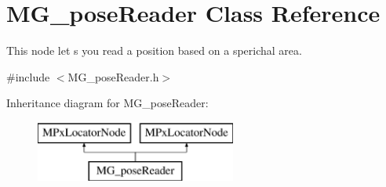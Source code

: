 \hypertarget{class_m_g__pose_reader}{\section{M\-G\-\_\-pose\-Reader Class Reference}
\label{class_m_g__pose_reader}
}


This node let s you read a position based on a sperichal area.  




{\ttfamily \#include $<$M\-G\-\_\-pose\-Reader.\-h$>$}

Inheritance diagram for M\-G\-\_\-pose\-Reader\-:\begin{figure}[H]
\begin{center}
\leavevmode
\includegraphics[height=2.000000cm]{class_m_g__pose_reader}
\end{center}
\end{figure}
